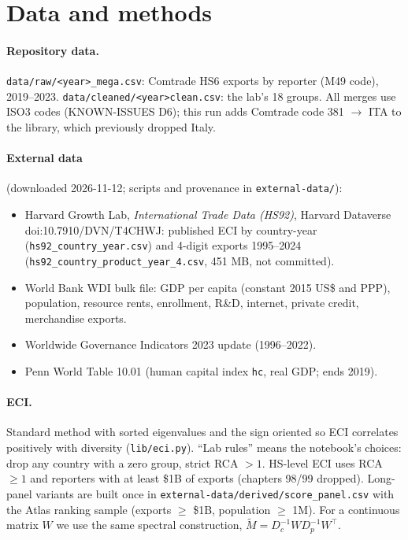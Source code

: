 \documentclass[11pt]{article}
\begin{document}
\section{Data and methods}\label{sec:data}

\paragraph{Repository data.} \texttt{data/raw/<year>\_mega.csv}: Comtrade HS6 exports by reporter (M49 code), 2019--2023. \texttt{data/cleaned/<year>clean.csv}: the lab's 18 groups. All merges use ISO3 codes (KNOWN-ISSUES D6); this run adds Comtrade code 381 $\rightarrow$ ITA to the library, which previously dropped Italy.

\paragraph{External data} (downloaded 2026-11-12; scripts and provenance in \texttt{external-data/}):
\begin{itemize}
\item Harvard Growth Lab, \emph{International Trade Data (HS92)}, Harvard Dataverse doi:10.7910/DVN/T4CHWJ: published ECI by country-year (\texttt{hs92\_country\_year.csv}) and 4-digit exports 1995--2024 (\texttt{hs92\_country\_product\_year\_4.csv}, 451 MB, not committed).
\item World Bank WDI bulk file: GDP per capita (constant 2015 US\$ and PPP), population, resource rents, enrollment, R\&D, internet, private credit, merchandise exports.
\item Worldwide Governance Indicators 2023 update (1996--2022).
\item Penn World Table 10.01 (human capital index \texttt{hc}, real GDP; ends 2019).
\end{itemize}

\paragraph{ECI.} Standard method with sorted eigenvalues and the sign oriented so ECI correlates positively with diversity (\texttt{lib/eci.py}). ``Lab rules'' means the notebook's choices: drop any country with a zero group, strict RCA $>1$. HS-level ECI uses RCA $\ge 1$ and reporters with at least \$1B of exports (chapters 98/99 dropped). Long-panel variants are built once in \texttt{external-data/derived/score\_panel.csv} with the Atlas ranking sample (exports $\ge$ \$1B, population $\ge$ 1M). For a continuous matrix $W$ we use the same spectral construction, $\tilde M = D_c^{-1} W D_p^{-1} W^\top$.
\end{document}
